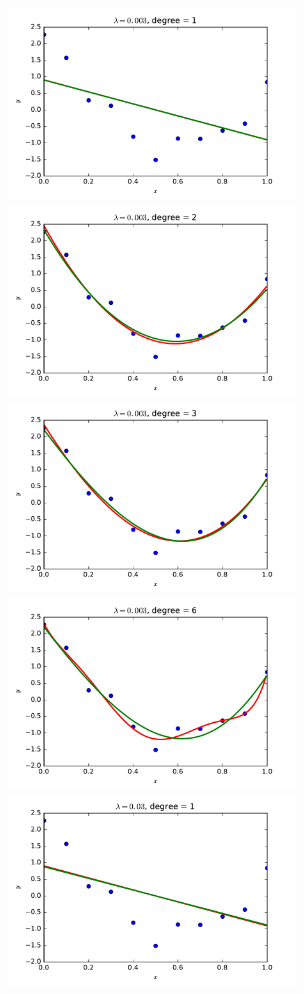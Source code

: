 \documentclass{article}
\begin{document}
\begin{multicols}{2}
\begin{figure}[p] %
   \centering
   \includegraphics[width=3in]{img/3-1_ridge_lambd3_degree1.pdf}
   \includegraphics[width=3in]{img/3-1_ridge_lambd3_degree2.pdf}
   \includegraphics[width=3in]{img/3-1_ridge_lambd3_degree3.pdf}
   \includegraphics[width=3in]{img/3-1_ridge_lambd3_degree6.pdf}
   \includegraphics[width=3in]{img/3-1_ridge_lambd30_degree1.pdf}

\end{figure}
\end{multicols}
\end{document}
